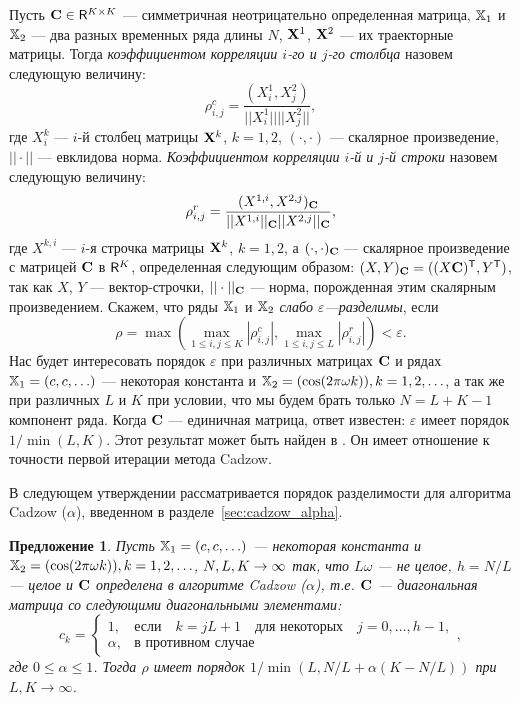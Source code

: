 \documentclass[12pt,a4paper,fleqn,leqno]{article}
\newtheorem{proposition}{Предложение}%
\begin{document}
Пусть $\mathbf{C} \in \mathsf{R}^{K \times K}$ --- симметричная неотрицательно определенная матрица, $\mathbb{X}_1$ и $\mathbb{X}_2$ ---  два разных временных ряда длины $N$, $\mathbf{X}^1$, $\mathbf{X}^2$ --- их траекторные матрицы. Тогда \emph{коэффициентом корреляции $i$-го и $j$-го столбца} назовем следующую величину:
\begin{equation}\label{col_corr}
\rho^c_{i,j} = \frac{(X^1_i, X^2_j)}{||X^1_i|| ||X^2_j||},
\end{equation}
где $X^k_i$ --- $i$-й столбец матрицы $\mathbf{X}^k$, $k = 1, 2$, $(\cdot, \cdot)$ --- скалярное произведение, $||\cdot||$ --- евклидова норма. \emph{Коэффициентом корреляции $i$-й и $j$-й строки} назовем следующую величину:
\begin{equation}\label{row_corr}
\rho^r_{i,j} = \frac{(X^{1,i}, X^{2,j})_{\mathbf{C}}}{||X^{1,i}||_{\mathbf{C}} ||X^{2,j}||_{\mathbf{C}}},
\end{equation}
где $X^{k,i}$ --- $i$-я строчка матрицы $\mathbf{X}^k$, $k = 1, 2$, а $(\cdot, \cdot)_{\mathbf{C}}$ --- скалярное произведение с матрицей $\mathbf{C}$ в $\mathsf{R}^K$, определенная следующим образом: $(X, Y)_{\mathbf{C}} = ((X\mathbf{C})^{\mathsf{T}}, Y^{\mathsf{T}})$, так как $X$, $Y$ --- вектор-строчки, $|| \cdot ||_{\mathbf{C}}$ --- норма, порожденная этим скалярным произведением. Скажем, что ряды $\mathbb{X}_1$ и $\mathbb{X}_2$ \emph{слабо $\varepsilon$---разделимы}, если
\begin{equation}\label{weak_sep_eq}
\rho = \max(\max_{1 \le i,j \le K}|\rho^c_{i,j}|, \max_{1 \le i,j \le L}|\rho^r_{i,j}|) < \varepsilon.
\end{equation}
Нас будет интересовать порядок $\varepsilon$ при различных матрицах $\mathbf{C}$ и рядах $\mathbb{X}_1 = (c, c, \ldots)$ --- некоторая константа и $\mathbb{X}_2 = (\cos(2 \pi \omega k)), k = 1, 2, \ldots$, а так же при различных $L$ и $K$ при условии, что мы будем брать только $N = L + K - 1$ компонент ряда. Когда $\mathbf{C}$ --- единичная матрица, ответ известен: $\varepsilon$ имеет порядок $1/\min(L,K)$. Этот результат может быть найден в \cite[Раздел 6.1]{Golyandina.etal2001}. Он имеет отношение к точности первой итерации метода Cadzow.

В следующем утверждении рассматривается порядок разделимости для алгоритма Cadzow ($\alpha$), введенном в разделе~\ref{sec:cadzow_alpha}.

\begin{proposition}
Пусть $\mathbb{X}_1 = (c, c, \ldots)$ --- некоторая константа и $\mathbb{X}_2 = (\cos(2 \pi \omega k)), k = 1, 2, \ldots$, $N,L,K\rightarrow \infty$ так, что $L\omega$ --- не целое, $h = N/L$ --- целое и $\mathbf{C}$ определена в алгоритме Cadzow ($\alpha$), т.е.  $\mathbf{C}$ --- диагональная матрица со следующими диагональными элементами:
\begin{equation*}
c_k = \begin{cases}
1, & \text{если} \quad k = jL+1 \quad \text{для некоторых} \quad j = 0, \ldots, h-1, \\
\alpha, & \text{в противном случае}
\end{cases},
\end{equation*}
где $0 \le \alpha \le 1$. Тогда $\rho$ имеет порядок $1/\min(L, N/L+\alpha(K - N/L))$ при $L, K \to \infty$.
\end{proposition}
\end{document}
